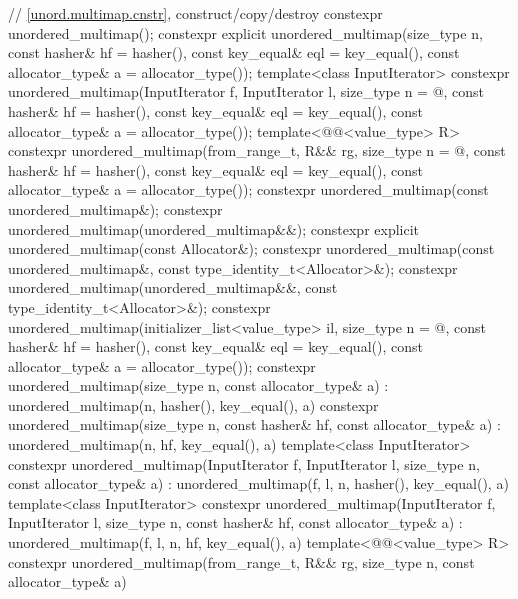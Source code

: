 \begin{codeblock}
{{    // \ref{unord.multimap.cnstr}, construct/copy/destroy
    constexpr unordered_multimap();
    constexpr explicit unordered_multimap(size_type n, const hasher& hf = hasher(),
                                          const key_equal& eql = key_equal(),
                                          const allocator_type& a = allocator_type());
    template<class InputIterator>
      constexpr unordered_multimap(InputIterator f, InputIterator l,
                                   size_type n = @\seebelow@, const hasher& hf = hasher(),
                                   const key_equal& eql = key_equal(),
                                   const allocator_type& a = allocator_type());
    template<@@<value_type> R>
      constexpr unordered_multimap(from_range_t, R&& rg,
                                   size_type n = @\seebelow@, const hasher& hf = hasher(),
                                   const key_equal& eql = key_equal(),
                                   const allocator_type& a = allocator_type());
    constexpr unordered_multimap(const unordered_multimap&);
    constexpr unordered_multimap(unordered_multimap&&);
    constexpr explicit unordered_multimap(const Allocator&);
    constexpr unordered_multimap(const unordered_multimap&, const type_identity_t<Allocator>&);
    constexpr unordered_multimap(unordered_multimap&&, const type_identity_t<Allocator>&);
    constexpr unordered_multimap(initializer_list<value_type> il,
                                 size_type n = @\seebelow@, const hasher& hf = hasher(),
                                 const key_equal& eql = key_equal(),
                                 const allocator_type& a = allocator_type());
    constexpr unordered_multimap(size_type n, const allocator_type& a)
      : unordered_multimap(n, hasher(), key_equal(), a) { }
    constexpr unordered_multimap(size_type n, const hasher& hf, const allocator_type& a)
      : unordered_multimap(n, hf, key_equal(), a) { }
    template<class InputIterator>
      constexpr unordered_multimap(InputIterator f, InputIterator l, size_type n,
                                   const allocator_type& a)
        : unordered_multimap(f, l, n, hasher(), key_equal(), a) { }
    template<class InputIterator>
      constexpr unordered_multimap(InputIterator f, InputIterator l, size_type n,
                                   const hasher& hf, const allocator_type& a)
        : unordered_multimap(f, l, n, hf, key_equal(), a) { }
  template<@@<value_type> R>
    constexpr unordered_multimap(from_range_t, R&& rg, size_type n, const allocator_type& a)
}}
\end{codeblock}
